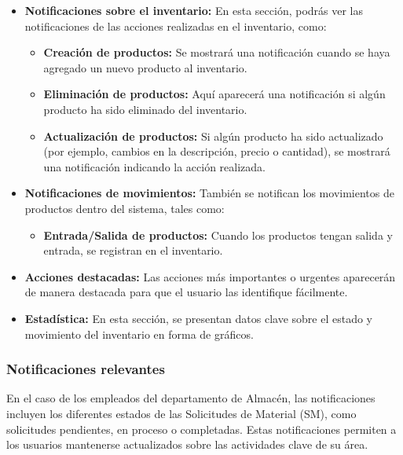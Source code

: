 \begin{itemize}
    \item \textbf{Notificaciones sobre el inventario:} En esta sección, podrás ver las notificaciones de las acciones realizadas en el inventario, como:
    \begin{itemize}
        \item \textbf{Creación de productos:} Se mostrará una notificación cuando se haya agregado un nuevo producto al inventario.
        \item \textbf{Eliminación de productos:} Aquí aparecerá una notificación si algún producto ha sido eliminado del inventario.
        \item \textbf{Actualización de productos:} Si algún producto ha sido actualizado (por ejemplo, cambios en la descripción, precio o cantidad), se mostrará una notificación indicando la acción realizada.
    \end{itemize}

    \item \textbf{Notificaciones de movimientos:} También se notifican los movimientos de productos dentro del sistema, tales como:
    \begin{itemize}
        \item \textbf{Entrada/Salida de productos:} Cuando los productos tengan salida y entrada, se registran en el inventario.
    \end{itemize}

    \item \textbf{Acciones destacadas:} Las acciones más importantes o urgentes aparecerán de manera destacada para que el usuario las identifique fácilmente.

    \item \textbf{Estadística:} En esta sección, se presentan datos clave sobre el estado y movimiento del inventario en forma de gráficos.
\end{itemize}

\subsubsection{Notificaciones relevantes}

En el caso de los empleados del departamento de Almacén, las notificaciones incluyen los diferentes estados de las Solicitudes de Material (SM), como solicitudes pendientes, en proceso o completadas. Estas notificaciones permiten a los usuarios mantenerse actualizados sobre las actividades clave de su área. 

